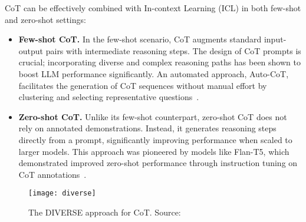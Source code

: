 CoT can be effectively combined with In-context Learning (ICL) in both few-shot and zero-shot settings:
\begin{itemize}
	\item \textbf{Few-shot CoT.} {In the few-shot scenario, CoT augments standard input-output pairs with intermediate reasoning steps.
		      The design of CoT prompts is crucial; incorporating diverse and complex reasoning paths has been shown to boost LLM performance significantly.
		      An automated approach, Auto-CoT, facilitates the generation of CoT sequences without manual effort by clustering and selecting representative questions~\cite{zhang2022automatic}.
	      }
	\item \textbf{Zero-shot CoT.} {Unlike its few-shot counterpart, zero-shot CoT does not rely on annotated demonstrations.
		      Instead, it generates reasoning steps directly from a prompt, significantly improving performance when scaled to larger models.
		      This approach was pioneered by models like Flan-T5, which demonstrated improved zero-shot performance through instruction tuning on CoT annotations~\cite{chung2022scaling}.
	      }
\end{itemize}

\begin{figure}[h!]
	\centering
	\texttt{[image: diverse]}
	\caption{The DIVERSE approach for CoT. Source: \textcite{li2022making}}
	\label{fig:diverse}
\end{figure}

